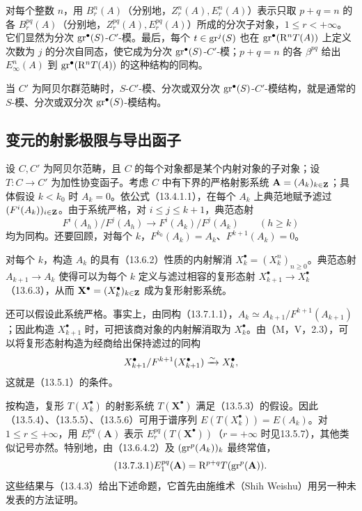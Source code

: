 对每个整数 $n$，用 $B_r^n(A)$（分别地，$Z_r^n(A),E_r^n(A)$）表示只取 $p+q=n$ 的各 $B_r^{pq}(A)$（分别地，$Z_r^{pq}(A),E_r^{pq}(A)$）所成的分次子对象，$1\leq r<+\infty$。它们显然为分次 $\operatorname{gr}^\bullet(S)$-$C'$-模。最后，每个 $t\in\operatorname{gr}^j(S)$ 也在 $\operatorname{gr}^\bullet(\mathrm R^nT(A))$ 上定义次数为 $j$ 的分次自同态，使它成为分次 $\operatorname{gr}^\bullet(S)$-$C'$-模；$p+q=n$ 的各 $\beta^{pq}$ 给出 $E_\infty^n(A)$ 到 $\operatorname{gr}^\bullet(\mathrm R^nT(A))$ 的这种结构的同构。

当 $C'$ 为阿贝尔群范畴时，$S$-$C'$-模、分次或双分次 $\operatorname{gr}^\bullet(S)$-$C'$-模结构，就是通常的 $S$-模、分次或双分次 $\operatorname{gr}^\bullet(S)$-模结构。\par

\subsection{变元的射影极限与导出函子}
设 $C,C'$ 为阿贝尔范畴，且 $C$ 的每个对象都是某个内射对象的子对象；设 $T:C\to C'$ 为加性协变函子。考虑 $C$ 中有下界的严格射影系统 $\mathbf A=(A_k)_{k\in\mathbf Z}$；具体假设 $k<k_0$ 时 $A_k=0$。依公式（13.4.1.1），在每个 $A_k$ 上典范地赋予滤过 $(F^i(A_k))_{i\in\mathbf Z}$。由于系统严格，对 $i\leq j\leq k+1$，典范态射
\begin{equation}\tag{13.7.1.1}
F^i(A_h)/F^j(A_h)\longrightarrow F^i(A_k)/F^j(A_k)\qquad(h\geq k)
\end{equation}
均为同构。还要回顾，对每个 $k$，$F^{k_0}(A_k)=A_k$、$F^{k+1}(A_k)=0$。

对每个 $k$，构造 $A_k$ 的具有（13.6.2）性质的内射解消 $X_k^\bullet=(X_k^n)_{n\geq0}$。典范态射 $A_{k+1}\to A_k$ 使得可以为每个 $k$ 定义与滤过相容的复形态射 $X_{k+1}^\bullet\to X_k^\bullet$（13.6.3），从而 $\mathbf X^\bullet=(X_k^\bullet)_{k\in\mathbf Z}$ 成为复形射影系统。

还可以假设此系统严格。事实上，由同构（13.7.1.1），$A_k\simeq A_{k+1}/F^{k+1}(A_{k+1})$；因此构造 $X_{k+1}^\bullet$ 时，可把该商对象的内射解消取为 $X_k^\bullet$。由（M，V，2.3），可以将复形态射构造为经商给出保持滤过的同构
\[
X_{k+1}^\bullet/F^{k+1}(X_{k+1}^\bullet)\xrightarrow{\sim} X_k^\bullet,
\]
这就是（13.5.1）的条件。

按构造，复形 $T(X_k^\bullet)$ 的射影系统 $T(\mathbf X^\bullet)$ 满足（13.5.3）的假设。因此（13.5.4）、（13.5.5）、（13.5.6）可用于谱序列 $E(T(X_k^\bullet))=E(A_k)$。对 $1\leq r\leq+\infty$，用 $E_r^{pq}(\mathbf A)$ 表示 $E_r^{pq}(T(\mathbf X^\bullet))$（$r=+\infty$ 时见13.5.7），其他类似记号亦然。特别地，由（13.6.4.2）及 $(\operatorname{gr}^p(A_k))_k$ 最终常值，
\begin{equation}\tag{13.7.3.1}
E_1^{pq}(\mathbf A)=\mathrm R^{p+q}T(\operatorname{gr}^p(\mathbf A)).
\end{equation}
这些结果与（13.4.3）给出下述命题，它首先由施维术（Shih Weishu）用另一种未发表的方法证明。

